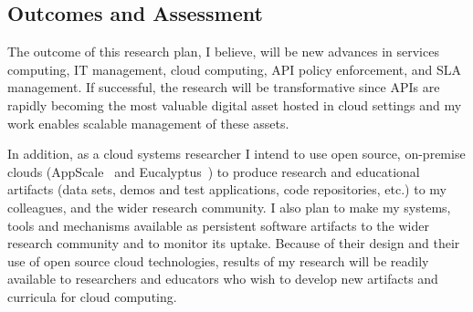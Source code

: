 \subsection{Outcomes and Assessment}

The outcome of this research plan,
I believe, will be new advances in services computing, IT management, cloud
computing, API policy enforcement, and SLA management.
If successful, the research will be transformative since APIs are rapidly
becoming the most valuable digital asset hosted in cloud settings
and my work enables scalable management of these assets.

In addition,
as a cloud systems researcher I intend to use open source, on-premise clouds (AppScale~\cite{krintzappscale13}
and Eucalyptus~\cite{eucalyptus09}) to produce research and educational artifacts (data sets, demos and test applications, 
code repositories, etc.) to my colleagues, 
and the wider research community.  
I also plan to make my systems, tools and mechanisms available as persistent software artifacts to
the wider research community and to monitor its uptake.  Because of their design
and their use of open source cloud technologies, results of my research will be readily available
to researchers and educators who wish to develop new artifacts and curricula
for cloud computing. 
